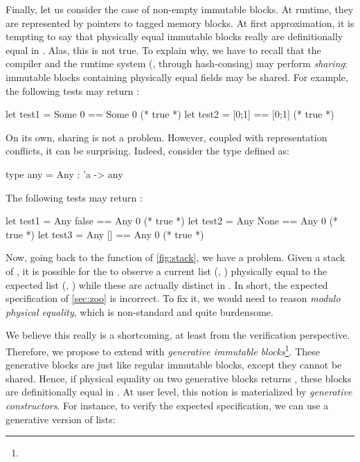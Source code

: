 Finally, let us consider the case of non-empty immutable blocks.
At runtime, they are represented by pointers to tagged memory blocks.
At first approximation, it is tempting to say that physically equal immutable blocks really are definitionally equal in \Rocq.
Alas, this is not true.
To explain why, we have to recall that the \OCaml compiler and the runtime system (\eg, through hash-consing) may perform \emph{sharing}: immutable blocks containing physically equal fields may be shared.
For example, the following tests may return :

\begin{ocamlcode}
let test1 = Some 0 == Some 0 (* true *)
let test2 = [0;1]  == [0;1]  (* true *)
\end{ocamlcode}

On its own, sharing is not a problem.
However, coupled with representation conflicts, it can be surprising.
Indeed, consider the  type defined as:

\begin{ocamlcode}
type any = Any : 'a -> any
\end{ocamlcode}

The following tests may return :

\begin{ocamlcode}
let test1 = Any false == Any 0 (* true *)
let test2 = Any None  == Any 0 (* true *)
let test3 = Any []    == Any 0 (* true *)
\end{ocamlcode}

Now, going back to the  function of \cref{fig:stack}, we have a problem.
Given a stack of , it is possible for the  to observe a current list (\eg, \ocamlinline{[Any 0]}) physically equal to the expected list (\eg, ) while these are actually distinct in \Rocq.
In short, the expected specification of \cref{sec:zoo} is incorrect.
To fix it, we would need to reason \emph{modulo physical equality}, which is non-standard and quite burdensome.

We believe this really is a shortcoming, at least from the verification perspective.
Therefore, we propose to extend \OCaml with \emph{generative immutable blocks}\footnote{}.
These generative blocks are just like regular immutable blocks, except they cannot be shared.
Hence, if physical equality on two generative blocks returns , these blocks are definitionally equal in \Rocq.
At user level, this notion is materialized by \emph{generative constructors}.
For instance, to verify the expected  specification, we can use a generative version of lists:

